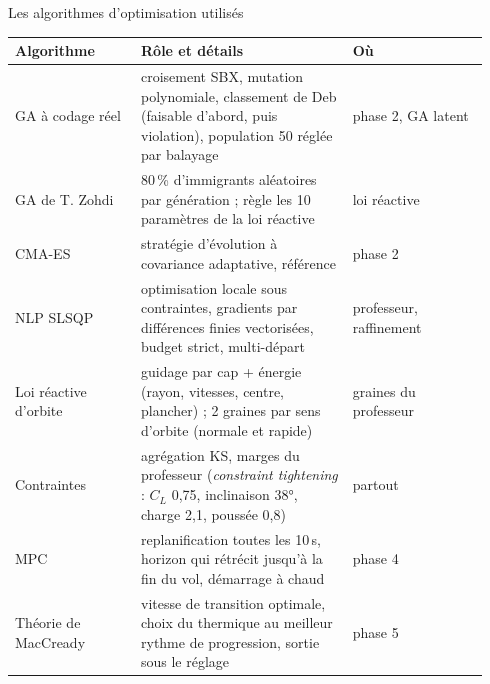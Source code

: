 \documentclass[aspectratio=169,10pt]{beamer}
\begin{document}
\begin{frame}{Les algorithmes d'optimisation utilisés}
  \footnotesize
  \begin{tabular}{@{}p{0.25\linewidth}p{0.42\linewidth}p{0.27\linewidth}@{}}
    \toprule
    Algorithme & Rôle et détails & Où \\ \midrule
    GA à codage réel & croisement SBX, mutation polynomiale, classement de Deb (faisable d'abord, puis violation), population 50 réglée par balayage & phase 2, GA latent \\
    GA de T. Zohdi & 80\,\% d'immigrants aléatoires par génération ; règle les 10 paramètres de la loi réactive & loi réactive \\
    CMA-ES & stratégie d'évolution à covariance adaptative, référence & phase 2 \\
    NLP SLSQP & optimisation locale sous contraintes, gradients par différences finies vectorisées, budget strict, multi-départ & professeur, raffinement \\
    Loi réactive d'orbite & guidage par cap + énergie (rayon, vitesses, centre, plancher) ; 2 graines par sens d'orbite (normale et rapide) & graines du professeur \\
    Contraintes & agrégation KS, marges du professeur (\emph{constraint tightening} : $C_L$ 0{,}75, inclinaison 38°, charge 2{,}1, poussée 0{,}8) & partout \\
    MPC & replanification toutes les 10\,s, horizon qui rétrécit jusqu'à la fin du vol, démarrage à chaud & phase 4 \\
    Théorie de MacCready & vitesse de transition optimale, choix du thermique au meilleur rythme de progression, sortie sous le réglage & phase 5 \\
    \bottomrule
  \end{tabular}
\end{frame}
\end{document}
